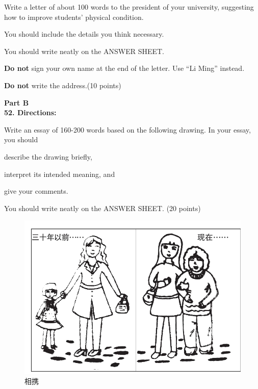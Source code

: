 Write a letter of about 100 words to the president of your university,
suggesting how to improve students' physical condition.

You should include the details you think necessary.

You should write neatly on the ANSWER SHEET.

\textbf{Do not} sign your own name at the end of the letter. Use ``Li
Ming'' instead.

\textbf{Do not} write the address.(10 points)


\vspace{2em}


\noindent
\textbf{Part B}\\
\textbf{52. Directions:}

Write an essay of 160-200 words based on the following drawing. In your
essay, you should
\begin{listwrite}
	\item
describe the drawing briefly,

\item 
interpret its intended meaning, and

\item 
give your comments.
\end{listwrite}

You should write neatly on the ANSWER SHEET. (20 points)



\begin{figure}[h!]
	\centering
	\includegraphics[width=0.56\linewidth]{picture/2014.png}
	\caption*{相携}
\end{figure}



